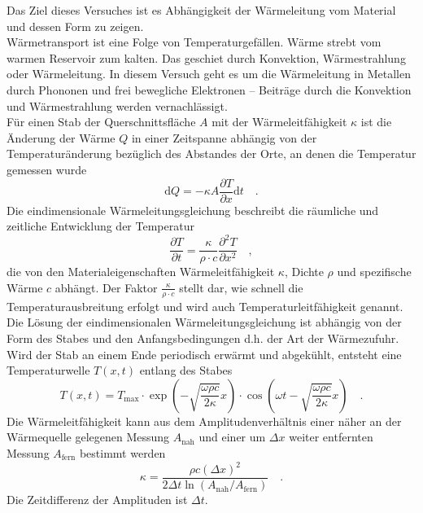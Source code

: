 Das Ziel dieses Versuches ist es Abhängigkeit der Wärmeleitung vom Material und dessen Form zu zeigen. \\
Wärmetransport ist eine Folge von Temperaturgefällen. Wärme strebt vom warmen Reservoir zum kalten. Das geschiet durch Konvektion, Wärmestrahlung oder Wärmeleitung. In diesem Versuch geht es um die Wärmeleitung in Metallen durch Phononen und frei bewegliche Elektronen -- Beiträge durch die Konvektion und Wärmestrahlung werden vernachlässigt. \\
Für einen Stab der Querschnittsfläche $A$ mit der Wärmeleitfähigkeit $\kappa$ ist die Änderung der Wärme $Q$ in einer Zeitspanne abhängig von der Temperaturänderung bezüglich des Abstandes der Orte, an denen die Temperatur gemessen wurde
\begin{equation}\label{Warmestrom}
\text{d}Q = - \kappa A \frac{\partial T}{\partial x} \text{d}t \quad .
\end{equation}
Die eindimensionale Wärmeleitungsgleichung beschreibt die räumliche und zeitliche Entwicklung der Temperatur
\begin{equation}
\frac{\partial T}{\partial t} = \frac{\kappa}{\rho \cdot c} \frac{\partial ^2 T}{\partial x^2} \quad,
\end{equation}
die von den Materialeigenschaften Wärmeleitfähigkeit $\kappa$, Dichte $\rho$ und spezifische Wärme $c$ abhängt.  Der Faktor $\frac{\kappa}{\rho \cdot c}$ stellt dar, wie schnell die Temperaturausbreitung erfolgt und wird auch Temperaturleitfähigkeit genannt. \\
Die Lösung der eindimensionalen Wärmeleitungsgleichung ist abhängig von der Form des Stabes und den Anfangsbedingungen d.h. der Art der Wärmezufuhr. Wird der Stab an einem Ende periodisch erwärmt und abgekühlt, entsteht eine Temperaturwelle $T(x,t)$ entlang des Stabes 
\begin{equation}
T(x,t) = T_\text{max} \cdot \exp\left( - \sqrt{\frac{\omega \rho c}{2 \kappa}}x\right) \cdot \cos \left(\omega t - \sqrt{\frac{\omega \rho c}{2 \kappa}}x\right) \quad.
\end{equation}
Die Wärmeleitfähigkeit kann aus dem Amplitudenverhältnis einer näher an der Wärmequelle gelegenen Messung $A_\text{nah}$ und einer um $\Delta x$ weiter entfernten Messung $A_\text{fern}$ bestimmt werden
\begin{equation}\label{Warmekappazitat}
\kappa = \frac{\rho  c (\Delta x )^2}{2  \Delta t \ln \left(A_\text{nah} / A_\text{fern}\right)} \quad.
\end{equation}
Die Zeitdifferenz der Amplituden ist $\Delta t$. \newpage
